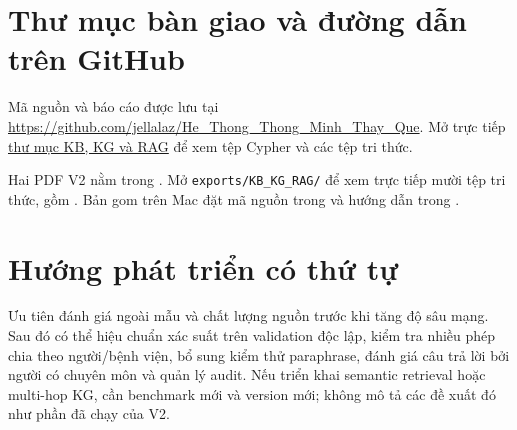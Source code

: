 \section{Thư mục bàn giao và đường dẫn trên GitHub}
Mã nguồn và báo cáo được lưu tại \url{https://github.com/jellalaz/He_Thong_Thong_Minh_Thay_Que}. Mở trực tiếp \href{https://github.com/jellalaz/He_Thong_Thong_Minh_Thay_Que/tree/main/exports/KB_KG_RAG}{thư mục KB, KG và RAG} để xem tệp Cypher và các tệp tri thức.

Hai PDF V2 nằm trong . Mở \nolinkurl{exports/KB_KG_RAG/} để xem trực tiếp mười tệp tri thức, gồm . Bản gom trên Mac đặt mã nguồn trong  và hướng dẫn trong .

\section{Hướng phát triển có thứ tự}
Ưu tiên đánh giá ngoài mẫu và chất lượng nguồn trước khi tăng độ sâu mạng. Sau đó có thể hiệu chuẩn xác suất trên validation độc lập, kiểm tra nhiều phép chia theo người/bệnh viện, bổ sung kiểm thử paraphrase, đánh giá câu trả lời bởi người có chuyên môn và quản lý audit. Nếu triển khai semantic retrieval hoặc multi-hop KG, cần benchmark mới và version mới; không mô tả các đề xuất đó như phần đã chạy của V2.
